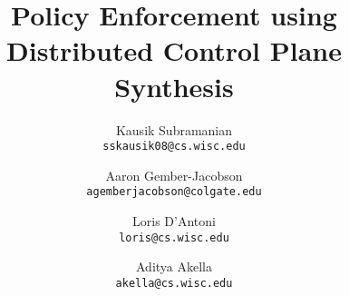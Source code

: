 \documentclass{hotnets16}
\begin{document}
 {}
\date{}


\title{Policy Enforcement using \\ Distributed Control Plane Synthesis
}
\author{
  Kausik Subramanian\\
  \texttt{sskausik08@cs.wisc.edu}
  \and
  Aaron Gember-Jacobson\\
  \texttt{agemberjacobson@colgate.edu}
  \and
  Loris D'Antoni\\
  \texttt{loris@cs.wisc.edu}
  \and
  Aditya Akella\\
  \texttt{akella@cs.wisc.edu}
}

\maketitle
















 
\begin{small}

\end{small}
\label{last-page}
\end{document}
